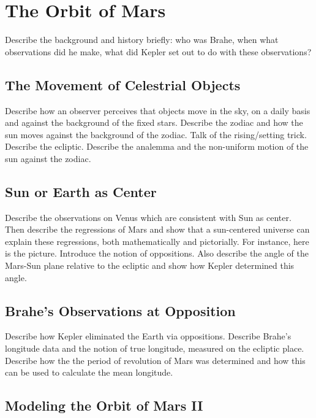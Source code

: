 

\chapter{The Orbit of Mars} 
\label{kepler}


Describe the background and history briefly: who was Brahe, when what observations did he make, what
did Kepler set out to do with these observations?


\section*{The Movement of Celestrial Objects}

Describe how an observer perceives that objects move in the sky, on a daily basis and 
against the background of the fixed stars. Describe the zodiac and how the sun moves against the
background of the zodiac. Talk of the rising/setting trick. 
Describe the ecliptic. Describe the analemma and the non-uniform
motion of the sun against the zodiac. 

\section*{Sun or Earth as Center}

Describe the observations on Venus which are consistent with Sun as center.
Then describe the regressions of Mars and show that a sun-centered universe
can explain these regressions, both mathematically and pictorially. For instance,
here is the picture. Introduce the notion of oppositions. Also describe the 
angle of the Mars-Sun plane relative to the ecliptic and show how Kepler determined
this angle.


\section*{Brahe's Observations at Opposition}

Describe how Kepler eliminated the Earth via oppositions. Describe Brahe's longitude data
and the notion of true longitude, measured on the ecliptic place. Describe how the the period of
revolution of Mars was determined and how this can be used to calculate the mean longitude.

\section*{Modeling the Orbit of Mars II}

